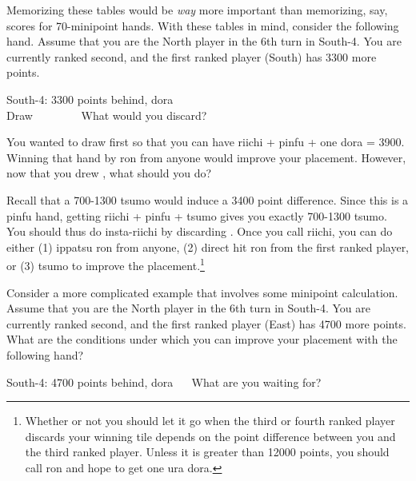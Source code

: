 \bigskip
Memorizing these tables would be \emph{way} more important than memorizing, say, scores for 70-minipoint hands. With these tables in mind, consider the following hand. Assume that you are the North player in the 6th turn in South-4. You are currently ranked second, and the first ranked player (South) has 3300 more points. 

\bigskip
\begin{itembox}[r]{South-4: 3300 points behind, {\jap dora} {\LARGE{}}}
\bp
{}~~\\
\hfill\footnotesize{Draw~~~~~~~~}
\ep
\vspace{-17pt}
What would you discard?
\end{itembox}

\bigskip
You wanted to draw {\LARGE{}} first so that you can have riichi + {\jap pinfu} + one {\jap dora} = 3900. Winning that hand by {\jap ron} from anyone would improve your placement. However, now that you drew {\LARGE{}}, what should you do?

\bigskip
Recall that a 700-1300 {\jap tsumo} would induce a 3400 point difference. Since this is a {\jap pinfu} hand, getting {\jap riichi + pinfu + tsumo} gives you exactly 700-1300 {\jap tsumo}. You should thus do insta-riichi by discarding {\LARGE{}}. Once you call riichi, you can do either (1) {\jap ippatsu ron} from anyone, (2) direct hit {\jap ron} from the first ranked player, or (3) {\jap tsumo} to improve the placement.\footnote{Whether or not you should let it go when the third or fourth ranked player discards your winning tile depends on the point difference between you and the third ranked player. Unless it is greater than 12000 points, you should call {\jap ron} and hope to get one {\jap ura dora}.}

\bigskip
Consider a more complicated example that involves some minipoint calculation. Assume that you are the North player in the 6th turn in South-4. You are currently ranked second, and the first ranked player (East) has 4700 more points. 
What are the conditions under which you can improve your placement with the following hand?

\bigskip
\begin{itembox}[r]{South-4: 4700 points behind, {\jap dora} {\LARGE{}}}
\bp
{}\fa\fa~~
\ep
\vspace{-5pt}
What are you waiting for?
\end{itembox}

